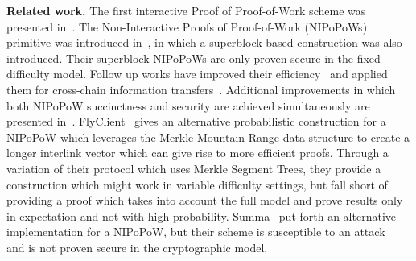 \noindent
\textbf{Related work.}
The first interactive Proof of Proof-of-Work scheme was presented
in~\cite{popow}. The Non-Interactive Proofs of Proof-of-Work (NIPoPoWs)
primitive was introduced in~\cite{nipopow}, in which a superblock-based
construction was also introduced. Their superblock NIPoPoWs are only proven
secure in the fixed difficulty model. Follow up works have improved their
efficiency~\cite{gtklocker,superblocks} and applied them for cross-chain information
transfers~\cite{pow-sidechains}. Additional improvements in which both
NIPoPoW succinctness and security are achieved simultaneously are presented
in~\cite{logspace}.
FlyClient~\cite{flyclient} gives an alternative probabilistic construction for a
NIPoPoW which leverages the Merkle Mountain Range data structure to create a
longer interlink vector which can give rise to more efficient proofs.
Through a variation of their protocol which uses Merkle Segment Trees, they
provide a construction which might work in variable difficulty settings, but
fall short of providing a proof which takes into account the full model and
prove results only in expectation and not with high probability.
Summa~\cite{summa} put forth an alternative implementation for a NIPoPoW, but
their scheme is susceptible to an attack~\cite{summa-composability} and is not
proven secure in the cryptographic model.
